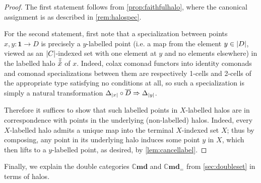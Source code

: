 \documentclass[11pt, oneside, article]{memoir}
\theoremstyle{plain}
\theoremstyle{definition}
\theoremstyle{remark}
\DeclareMathOperator{\ophelper}{op}
\DeclarePairedDelimiter{\abs}{\lvert}{\rvert}
\newcommand{\op}{^{\ophelper}}
\newcommand{\bang}{\mathrm{!}}
\newcommand{\namedcat}[1]{\mathbf{#1}}
\newcommand{\Halo}{\namedcat{Halo}}
\newcommand{\LHalo}[1]{\Halo_{#1}}
\newcommand{\Set}{\namedcat{Set}}
\newcommand{\Cmd}{\mathbb{C}\namedcat{md}}
\newcommand{\CmdSet}{\Cmd}
\newcommand{\CmdId}{\Cmd_=}
\newcommand{\CmdIdSet}{\CmdId}
\newcommand{\clift}[1]{\overline{#1}}
\newcommand{\pts}[1]{{\abs{#1}}}
\newcommand{\one}[1]{\pts{#1}}
\newcommand{\lhalo}[1]{\accentset{\overline{\circ}}{#1}}
\newcommand{\reindex}[1]{\Delta_{#1}}
\newcommand{\point}{\mathbf{1}}
\newcommand{\slicel}{\Sigma_\bang}
\newcommand{\fun}[2]{{#2}^{#1}}
\newcommand{\End}[1]{\fun{#1}{#1}}
\newcommand{\SetSet}{\End{\Set}}
\newcommand{\cmnd}[1]{{#1}}
\newcommand{\xA}{A}
\newcommand{\xX}{X}
\newcommand{\cC}{\cmnd{C}}
\newcommand{\cD}{\cmnd{D}}
\begin{document}
\begin{proof}
  The first statement follows from \cref{prop:faithfulhalo}, where the
  canonical assignment is as described in \cref{rem:halospec}.

  For the second statement, first note that a specialization between
  points $x, y \colon \point \to \cD$ is precisely a $y$-labelled
  point (i.e. a map from the element $y \in \pts{\cD}$, viewed as an
  $\pts{\cC}$-indexed set with one element at $y$ and no elements
  elsewhere) in the labelled halo $\lhalo{x}$ of $x$.  Indeed, colax
  comonad functors into identity comonads and comonad specializations
  between them are respectively 1-cells and 2-cells of the appropriate
  type satisfying no conditions at all, so such a specialization is
  simply a natural transformation
  $\reindex{\one{x}} \circ \clift{\cD} \Rightarrow \reindex{\one{y}}$.

  Therefore it suffices to show that such labelled points in
  $\xX$-labelled halos are in correspondence with points in the
  underlying (non-labelled) halos. Indeed, every $\xX$-labelled halo
  admits a unique map into the terminal $\xX$-indexed set $\xX$; thus
  by composing, any point in its underlying halo induces some point
  $y$ in $\xX$, which then lifts to a $y$-labelled point, as desired,
  by \cref{lem:cancellabel}.
\end{proof}

Finally, we explain the double categories $\CmdSet$ and $\CmdIdSet$
from \cref{sec:doubleset} in terms of halos.
\end{document}
